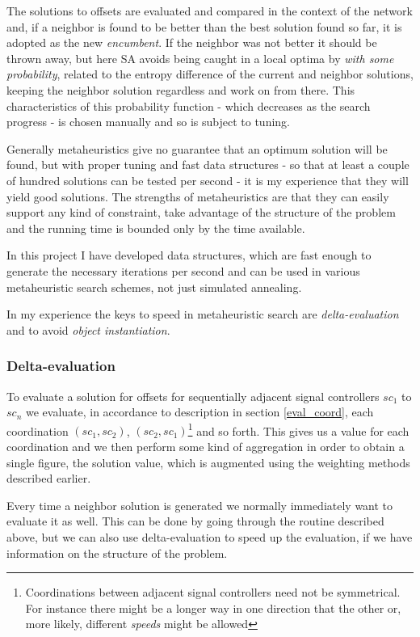 The solutions to offsets are evaluated and compared in the context of the network and, if a neighbor is found to be better than the best solution found so far, it is adopted as the new \textit{encumbent}. If the neighbor was not better it should be thrown away, but here SA avoids being caught in a local optima by \textit{with some probability}, related to the entropy difference of the current and neighbor solutions, keeping the neighbor solution regardless and work on from there. This characteristics of this probability function - which decreases as the search progress  - is chosen manually and so is subject to tuning.

Generally metaheuristics give no guarantee that an optimum solution will be found, but with proper tuning and fast data structures - so that at least a couple of hundred solutions can be tested per second - it is my experience that they will yield good solutions. The strengths of metaheuristics are that they can easily support any kind of constraint, take advantage of the structure of the problem and the running time is bounded only by the time available.

In this project I have developed data structures, which are fast enough to generate the necessary iterations per second and can be used in various metaheuristic search schemes, not just simulated annealing.

In my experience the keys to speed in metaheuristic search are \textit{delta-evaluation} and to avoid \textit{object instantiation}.

\subsubsection{Delta-evaluation}
To evaluate a solution for offsets for sequentially adjacent signal controllers $sc_1$ to $sc_n$ we evaluate, in accordance to description in section \ref{eval_coord}, each coordination $(sc_1,sc_2)$, $(sc_2,sc_1)$\footnote{Coordinations between adjacent signal controllers need not be symmetrical. For instance there might be a longer way in one direction that the other or, more likely, different \textit{speeds} might be allowed} and so forth. This gives us a value for each coordination and we then perform some kind of aggregation in order to obtain a single figure, the solution value, which is augmented using the weighting methods described earlier.

Every time a neighbor solution is generated we normally immediately want to evaluate it as well. This can be done by going through the routine described above, but we can also use delta-evaluation to speed up the evaluation, if we have information on the structure of the problem.

